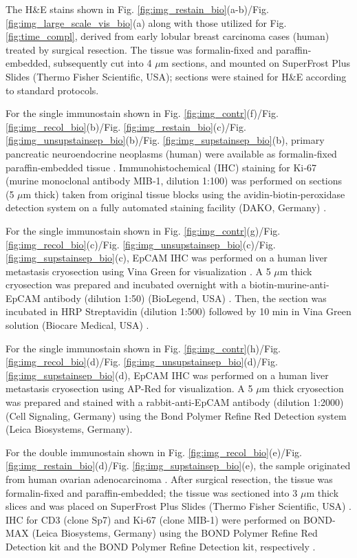 \documentclass[superscriptaddress,longbibliography,aps,prl,twocolumn,10pt]{revtex4-2}
\begin{document}
The H\&E stains shown in Fig. \ref{fig:img_restain_bio}(a-b)/Fig. \ref{fig:img_large_scale_vis_bio}(a) along with those utilized for Fig. \ref{fig:time_compl}, derived from early lobular breast carcinoma cases (human) treated by surgical resection. The tissue was formalin-fixed and paraffin-embedded, subsequently cut into 4 $\mu$m sections, and mounted on SuperFrost Plus Slides (Thermo Fisher Scientific, USA); sections were stained for H\&E according to standard protocols.

For the single immunostain shown in Fig. \ref{fig:img_contr}(f)/Fig. \ref{fig:img_recol_bio}(b)/Fig. \ref{fig:img_restain_bio}(c)/Fig. \ref{fig:img_unsupstainsep_bio}(b)/Fig. \ref{fig:img_supstainsep_bio}(b), primary pancreatic neuroendocrine neoplasms (human) were available as formalin‐fixed paraffin‐embedded tissue \cite{Valous2016}. Immunohistochemical (IHC) staining for Ki‐67 (murine monoclonal antibody MIB‐1, dilution 1:100) was performed on sections (5 $\mu$m thick) taken from original tissue blocks using the avidin‐biotin‐peroxidase detection system on a fully automated staining facility (DAKO, Germany) \cite{Valous2016}.

For the single immunostain shown in Fig. \ref{fig:img_contr}(g)/Fig. \ref{fig:img_recol_bio}(c)/Fig. \ref{fig:img_unsupstainsep_bio}(c)/Fig. \ref{fig:img_supstainsep_bio}(c), EpCAM IHC was performed on a human liver metastasis cryosection using Vina Green for visualization \cite{Berthel2019}. A 5 $\mu$m thick cryosection was prepared and incubated overnight with a biotin-murine-anti-EpCAM antibody (dilution 1:50) (BioLegend, USA) \cite{Berthel2019}. Then, the section was incubated in HRP Streptavidin (dilution 1:500) followed by 10 min in Vina Green solution (Biocare Medical, USA) \cite{Berthel2019}.

For the single immunostain shown in Fig. \ref{fig:img_contr}(h)/Fig. \ref{fig:img_recol_bio}(d)/Fig. \ref{fig:img_unsupstainsep_bio}(d)/Fig. \ref{fig:img_supstainsep_bio}(d), EpCAM IHC was performed on a human liver metastasis cryosection using AP-Red for visualization. A 5 $\mu$m thick cryosection was prepared and stained with a rabbit-anti-EpCAM antibody (dilution 1:2000) (Cell Signaling, Germany) using the Bond Polymer Refine Red Detection system (Leica Biosystems, Germany).

For the double immunostain shown in Fig. \ref{fig:img_recol_bio}(e)/Fig. \ref{fig:img_restain_bio}(d)/Fig. \ref{fig:img_supstainsep_bio}(e), the sample originated from human ovarian adenocarcinoma \cite{SuarezCarmona2019}. After surgical resection, the tissue was formalin-fixed and paraffin-embedded; the tissue was sectioned into 3 $\mu$m thick slices and was placed on SuperFrost Plus Slides (Thermo Fisher Scientific, USA) \cite{SuarezCarmona2019}. IHC for CD3 (clone Sp7) and Ki-67 (clone MIB-1) were performed on BOND-MAX (Leica Biosystems, Germany) using the BOND Polymer Refine Red Detection kit and the BOND Polymer Refine Detection kit, respectively \cite{SuarezCarmona2019}.
\end{document}
